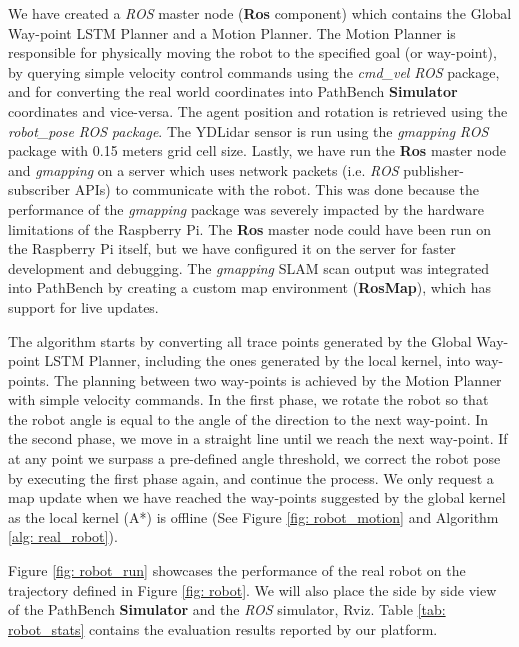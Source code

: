 We have created a \textit{ROS} master node (\textbf{Ros} component) which contains the Global Way-point LSTM Planner and a Motion Planner. The Motion Planner is responsible for physically moving the robot to the specified goal (or way-point), by querying simple velocity control commands using the \textit{cmd\_vel} \textit{ROS} package, and for converting the real world coordinates into PathBench \textbf{Simulator} coordinates and vice-versa. The agent position and rotation is retrieved using the \textit{robot\_pose} \textit{ROS} \textit{package}. The YDLidar sensor is run using the \textit{gmapping} \textit{ROS} package with 0.15 meters grid cell size. Lastly, we have run the \textbf{Ros} master node and \textit{gmapping} on a server which uses network packets (i.e. \textit{ROS} publisher-subscriber APIs) to communicate with the robot. This was done because the performance of the \textit{gmapping} package was severely impacted by the hardware limitations of the Raspberry Pi. The \textbf{Ros} master node could have been run on the Raspberry Pi itself, but we have configured it on the server for faster development and debugging. The \textit{gmapping} SLAM scan output was integrated into PathBench by creating a custom map environment (\textbf{RosMap}), which has support for live updates.

The algorithm starts by converting all trace points generated by the Global Way-point LSTM Planner, including the ones generated by the local kernel, into way-points. The planning between two way-points is achieved by the Motion Planner with simple velocity commands. In the first phase, we rotate the robot so that the robot angle is equal to the angle of the direction to the next way-point. In the second phase, we move in a straight line until we reach the next way-point. If at any point we surpass a pre-defined angle threshold, we correct the robot pose by executing the first phase again, and continue the process. We only request a map update when we have reached the way-points suggested by the global kernel as the local kernel (A*) is offline (See Figure \ref{fig: robot_motion} and Algorithm \ref{alg: real_robot}).

Figure \ref{fig: robot_run} showcases the performance of the real robot on the trajectory defined in Figure \ref{fig: robot}. We will also place the side by side view of the PathBench \textbf{Simulator} and the \textit{ROS} simulator, Rviz. Table \ref{tab: robot_stats} contains the evaluation results reported by our platform.

\pagebreak

